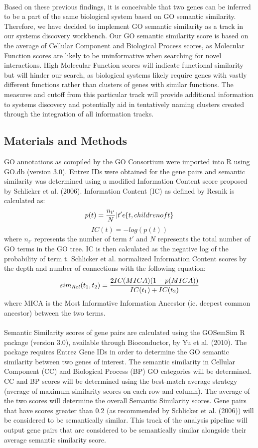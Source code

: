 \documentclass{article}
\begin{document}
\paragraph{}
Based on these previous findings, it is conceivable that two genes can be inferred to be a part of the same biological system based on GO semantic similarity. Therefore, we have decided to implement GO semantic similarity as a track in our systems discovery workbench. Our GO semantic similarity score is based on the average of Cellular Component and Biological Process scores, as Molecular Function scores are likely to be uninformative when searching for novel interactions. High Molecular Function scores will indicate functional similarity but will hinder our search, as biological systems likely require genes with vastly different functions rather than clusters of genes with similar functions. The measures and cutoff from this particular track will provide additional information to systems discovery and potentially aid in tentatively naming clusters created through the integration of all information tracks.

\subsection{Materials and Methods}
GO annotations as compiled by the GO Consortium were imported into R using GO.db (version 3.0). Entrez IDs were obtained for the gene pairs and semantic similarity was determined using a modified Information Content score proposed by Schlicker et al. (2006).
Information Content (IC) as defined by Resnik is calculated as:
\[ p(t) = {{n_{t'}} \over {N}} | t' \epsilon  \{t, children of t\} \]
\[ IC(t) = {-log(p(t))} \]
where $n_{t'}$ represents the number of term $t'$ and $N$ represents the total number of GO terms in the GO tree. IC is then calculated as the negative log of the probability of term t.
Schlicker et al. normalized Information Content scores by the depth and number of connections with the following equation:
\[sim_{Rel}(t_1, t_2) = {{2IC(MICA)(1-p(MICA))} \over {IC(t_{1}) + IC(t_{2})}} \]
where MICA is the Most Informative Information Ancestor (ie. deepest common ancestor) between the two terms.
\paragraph{}
Semantic Similarity scores of gene pairs are calculated using the GOSemSim R package (version 3.0), available through Bioconductor, by Yu et al. (2010). The package requires Entrez Gene IDs in order to determine the GO semantic similarity between two genes of interest. The semantic similarity in Cellular Component (CC) and Biological Process (BP) GO categories will be determined. CC and BP scores will be determined using the best-match average strategy (average of maximum similarity scores on each row and column). The average of the two scores will determine the overall Semantic Similarity scores. Gene pairs that have scores greater than 0.2 (as recommended by Schlicker et al. (2006)) will be considered to be semantically similar. This track of the analysis pipeline will output gene pairs that are considered to be semantically similar alongside their average semantic similarity score.
\end{document}
